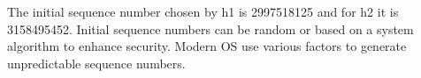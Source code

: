 The initial sequence number chosen by h1 is 2997518125
and for h2 it is 3158495452.
Initial sequence numbers can be random or based on a system algorithm to enhance security. Modern OS use various factors to generate unpredictable sequence numbers.